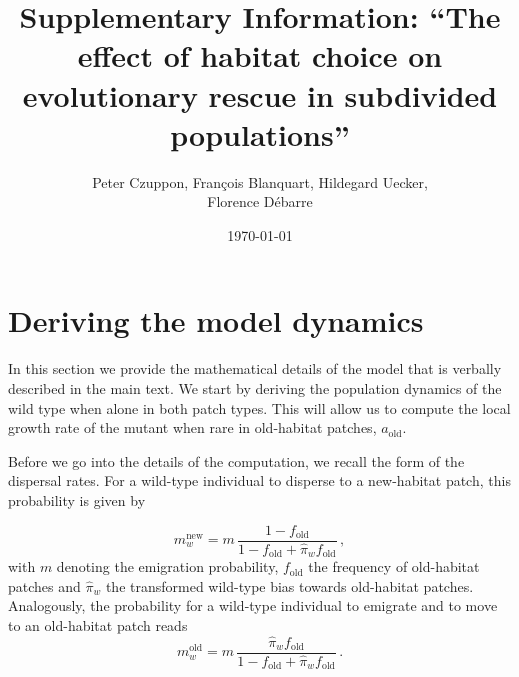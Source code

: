 \documentclass[a4paper,11pt]{scrartcl}
\title{Supplementary Information: ``The effect of habitat choice on evolutionary rescue in subdivided populations''}
\author{Peter Czuppon, Fran\c{c}ois Blanquart, Hildegard Uecker,\\ Florence D\'{e}barre}
\date{\today}
\newcommand{\chg}[1]{\textcolor{change}{#1}}
\begin{document}
\maketitle

\tableofcontents
\newpage

\renewcommand\thelinenumber{S\arabic{linenumber}}
\linenumbers{}
\modulolinenumbers[2]


\section{Deriving the model dynamics}
In this section we provide the mathematical \chg{details} of the model that is verbally described in the main text. We start by deriving the population dynamics of the wild type \chg{when alone} in both patch types. This will allow us to compute the local growth rate of the mutant \chg{when rare} in old-habitat patches, $a_{\text{old}}$.  

Before we go into the details of the computation, we recall the form of the dispersal rates. For a wild-type individual to disperse to a new-habitat patch, this probability is given by

\begin{equation}\label{Seq:dispersal_rates_old}
    m_w^{\text{new}} = m\, \frac{1-f_{\text{old}}}{1-f_{\text{old}} + \widehat{\pi}_w f_{\text{old}}}\, ,
\end{equation}
%
with $m$ denoting the emigration probability, $f_{\text{old}}$ the frequency of old-habitat patches and $\widehat{\pi}_w$ the transformed wild-type bias towards old-habitat patches.
Analogously, the probability for a wild-type individual \chg{to emigrate and} to move to an old-habitat patch reads
%
\begin{equation}\label{Seq:dispersal_rate_new}
    m_w^{\text{old}} = m\, \frac{\widehat{\pi}_w f_{\text{old}}}{1-f_{\text{old}} + \widehat{\pi}_w f_{\text{old}}}\, .
\end{equation}
\\
\end{document}
